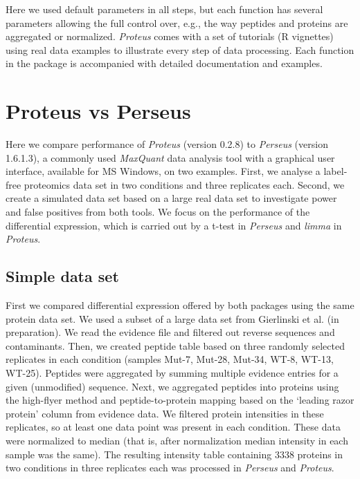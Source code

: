 \documentclass[]{article}
\begin{document}
Here we used default parameters in all steps, but each function has
several parameters allowing the full control over, e.g., the way
peptides and proteins are aggregated or normalized. \emph{Proteus} comes
with a set of tutorials (R vignettes) using real data examples to
illustrate every step of data processing. Each function in the package
is accompanied with detailed documentation and examples.

\section{Proteus vs Perseus}\label{proteus-vs-perseus}

Here we compare performance of \emph{Proteus} (version 0.2.8) to
\emph{Perseus} (version 1.6.1.3), a commonly used \emph{MaxQuant} data
analysis tool with a graphical user interface, available for MS Windows,
on two examples. First, we analyse a label-free proteomics data set in
two conditions and three replicates each. Second, we create a simulated
data set based on a large real data set to investigate power and false
positives from both tools. We focus on the performance of the
differential expression, which is carried out by a t-test in
\emph{Perseus} and \emph{limma} in \emph{Proteus}.

\subsection{Simple data set}\label{simple-data-set}

First we compared differential expression offered by both packages using
the same protein data set. We used a subset of a large data set from
Gierlinski et al. (in preparation). We read the evidence file and
filtered out reverse sequences and contaminants. Then, we created
peptide table based on three randomly selected replicates in each
condition (samples Mut-7, Mut-28, Mut-34, WT-8, WT-13, WT-25). Peptides
were aggregated by summing multiple evidence entries for a given
(unmodified) sequence. Next, we aggregated peptides into proteins using
the high-flyer method and peptide-to-protein mapping based on the
`leading razor protein' column from evidence data. We filtered protein
intensities in these replicates, so at least one data point was present
in each condition. These data were normalized to median (that is, after
normalization median intensity in each sample was the same). The
resulting intensity table containing 3338 proteins in two conditions in
three replicates each was processed in \emph{Perseus} and
\emph{Proteus}.
\end{document}
